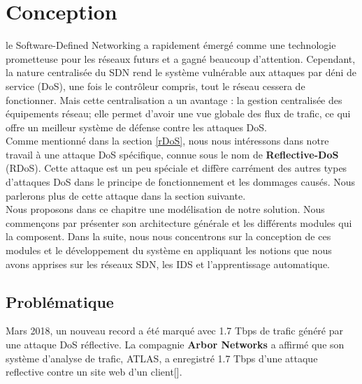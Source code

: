 \chapter{Conception}

\label{Chapter4} 
le Software-Defined Networking a rapidement émergé comme une technologie prometteuse pour les réseaux futurs et a gagné beaucoup d'attention. Cependant, la nature centralisée du SDN rend le système vulnérable aux attaques par déni de service (DoS), une fois le contrôleur compris, tout le réseau cessera de fonctionner. Mais cette centralisation a un avantage : la gestion centralisée des équipements réseau; elle permet d'avoir une vue globale des flux de trafic, ce qui offre un meilleur système de défense contre les attaques DoS.\\

Comme mentionné dans la section \ref{rDoS}, nous nous intéressons dans notre travail à une attaque DoS spécifique, connue sous le nom de \textbf{Reflective-DoS} (RDoS). Cette attaque est un peu spéciale et diffère carrément des autres types d'attaques DoS dans le principe de fonctionnement et les dommages causés. Nous parlerons plus de cette attaque dans la section suivante. \\

Nous proposons dans ce chapitre une modélisation de notre solution. Nous commençons par présenter son architecture générale et les différents modules qui la composent. Dans la suite, nous nous concentrons sur la conception de ces modules et le développement du système en appliquant les notions que nous avons apprises sur les réseaux SDN, les IDS et l’apprentissage automatique.

\section{Problématique}
Mars 2018, un nouveau record a été marqué avec 1.7 Tbps de trafic généré par une attaque DoS réflective. La compagnie \textbf{Arbor Networks} a affirmé que son système d'analyse de trafic, ATLAS, a enregistré 1.7 Tbps d'une attaque reflective contre un site web d'un client[\cite{22}].\\

